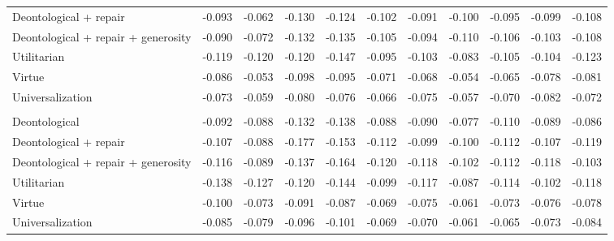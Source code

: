 \begin{table}[t]
\begin{tabular}{lrrrrrrrrrr}
Deontological + repair & -0.093 & -0.062 & -0.130 & -0.124 & -0.102 & -0.091 & -0.100 & -0.095 & -0.099 & -0.108 \\
Deontological + repair + generosity & -0.090 & -0.072 & -0.132 & -0.135 & -0.105 & -0.094 & -0.110 & -0.106 & -0.103 & -0.108 \\
Utilitarian & -0.119 & -0.120 & -0.120 & -0.147 & -0.095 & -0.103 & -0.083 & -0.105 & -0.104 & -0.123 \\
Virtue & -0.086 & -0.053 & -0.098 & -0.095 & -0.071 & -0.068 & -0.054 & -0.065 & -0.078 & -0.081 \\
Universalization & -0.073 & -0.059 & -0.080 & -0.076 & -0.066 & -0.075 & -0.057 & -0.070 & -0.082 & -0.072 \\
\addlinespace
\multicolumn{11}{l}{\emph{Chicken}} \\
Deontological & -0.092 & -0.088 & -0.132 & -0.138 & -0.088 & -0.090 & -0.077 & -0.110 & -0.089 & -0.086 \\
Deontological + repair & -0.107 & -0.088 & -0.177 & -0.153 & -0.112 & -0.099 & -0.100 & -0.112 & -0.107 & -0.119 \\
Deontological + repair + generosity & -0.116 & -0.089 & -0.137 & -0.164 & -0.120 & -0.118 & -0.102 & -0.112 & -0.118 & -0.103 \\
Utilitarian & -0.138 & -0.127 & -0.120 & -0.144 & -0.099 & -0.117 & -0.087 & -0.114 & -0.102 & -0.118 \\
Virtue & -0.100 & -0.073 & -0.091 & -0.087 & -0.069 & -0.075 & -0.061 & -0.073 & -0.076 & -0.078 \\
Universalization & -0.085 & -0.079 & -0.096 & -0.101 & -0.069 & -0.070 & -0.061 & -0.065 & -0.073 & -0.084 \\
\bottomrule
\end{tabular}
\end{table}
